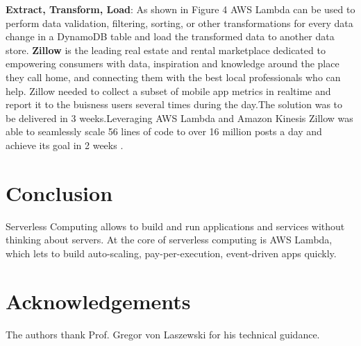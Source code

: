 \documentclass[9pt,twocolumn,twoside]{../../styles/osajnl}
\begin{document}
\begin{figure}[H]
\centering
\graphicspath{ {images/} }
\caption{} \cite{www-AWSLambda}
\label{fig:false-color}
\end{figure}

\textbf{Extract, Transform, Load}: As shown in Figure 4 AWS Lambda can be used 
to perform data validation, filtering, sorting, or other transformations for 
every data change in a DynamoDB table and load the transformed data to another 
data store. \textbf{Zillow} is the leading real estate and rental marketplace 
dedicated to empowering consumers with data, inspiration and knowledge around 
the place they call home, and connecting them with the best local professionals 
who can help. Zillow needed to collect a subset of mobile app metrics in 
realtime and report it to the buisness users several times during the day.The 
solution was to be delivered in 3 weeks.Leveraging AWS Lambda and Amazon 
Kinesis Zillow was able to seamlessly scale 56 lines of code to over 16 million 
posts a day and achieve its goal in 2 weeks \cite{www-AWSLambdaZillow}.


\section{Conclusion}
Serverless Computing allows to build and run applications and services without 
thinking about servers. At the core of serverless computing is AWS Lambda, 
which lets to build auto-scaling, pay-per-execution, event-driven apps quickly.

\section*{Acknowledgements}

The authors thank Prof. Gregor von Laszewski for his technical guidance.


\end{document}
